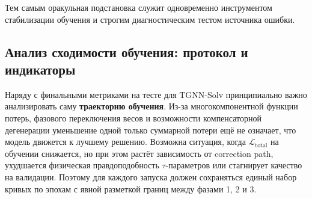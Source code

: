 \documentclass[11pt]{article}
\begin{document}
Тем самым оракульная подстановка служит одновременно инструментом стабилизации обучения и строгим диагностическим тестом источника ошибки.

\subsection{Анализ сходимости обучения: протокол и индикаторы}
\label{subsec:training-convergence-protocol}

Наряду с финальными метриками на тесте для TGNN-Solv принципиально важно анализировать саму \textbf{траекторию обучения}. Из-за многокомпонентной функции потерь, фазового переключения весов и возможности компенсаторной дегенерации уменьшение одной только суммарной потери ещё не означает, что модель движется к лучшему решению. Возможна ситуация, когда $\mathcal{L}_{\mathrm{total}}$ на обучении снижается, но при этом растёт зависимость от correction path, ухудшается физическая правдоподобность $\tau$-параметров или стагнирует качество на валидации. Поэтому для каждого запуска должен сохраняться единый набор кривых по эпохам с явной разметкой границ между фазами 1, 2 и 3.
\end{document}
